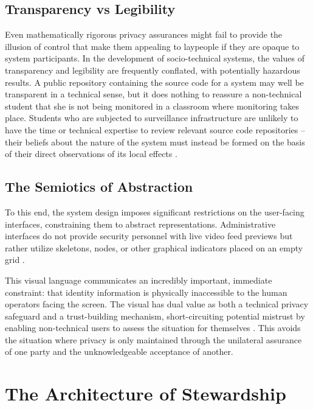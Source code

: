 \documentclass[conference]{IEEEtran}
\begin{document}
\subsection{Transparency vs Legibility}
Even mathematically rigorous privacy assurances might fail to provide the illusion of control that make them appealing to laypeople if they are opaque to system participants. In the development of socio-technical systems, the values of transparency and legibility are frequently conflated, with potentially hazardous results. A public repository containing the source code for a system may well be transparent in a technical sense, but it does nothing to reassure a non-technical student that she is not being monitored in a classroom where monitoring takes place. Students who are subjected to surveillance infrastructure are unlikely to have the time or technical expertise to review relevant source code repositories – their beliefs about the nature of the system must instead be formed on the basis of their direct observations of its local effects \cite{b14}.

\subsection{The Semiotics of Abstraction}

To this end, the system design imposes significant restrictions on the user-facing interfaces, constraining them to abstract representations. Administrative interfaces do not provide security personnel with live video feed previews but rather utilize skeletons, nodes, or other graphical indicators placed on an empty grid \cite{b18, b19}.

This visual language communicates an incredibly important, immediate constraint: that identity information is physically inaccessible to the human operators facing the screen. The visual has dual value as both a technical privacy safeguard and a trust-building mechanism, short-circuiting potential mistrust by enabling non-technical users to assess the situation for themselves \cite{b7}. This avoids the situation where privacy is only maintained through the unilateral assurance of one party and the unknowledgeable acceptance of another.

\section{The Architecture of Stewardship}
\end{document}
